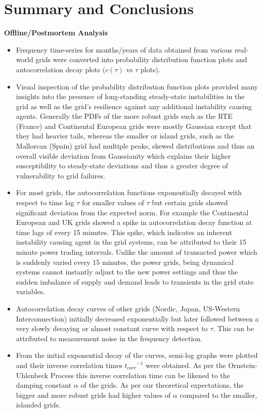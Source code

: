 \section[Conclusions]{Summary and Conclusions}
\label{sec:concl}

\noindent\textbf{Offline/Postmortem Analysis}
\begin{itemize}
	\item Frequency time-series for months/years of data obtained from various real-world grids were converted into probability distribution function plots and autocorrelation decay plots ($c(\tau)$ vs $\tau$ plots).
	\item Visual inspection of the probability distribution function plots provided many insights into the presence of long-standing steady-state instabilities in the grid as well as the grid's resilience against any additional instability causing agents. Generally the PDFs of the more robust grids such as the RTE (France) and Continental European grids were mostly Gaussian except that they had heavier tails, whereas the smaller or island grids, such as the Mallorcan (Spain) grid had multiple peaks, skewed distributions and thus an overall visible deviation from Gaussianity which explains their higher susceptibility to steady-state deviations and thus a greater degree of vulnerability to grid failures. 
	\item For most grids, the autocorrelation functions exponentially decayed with respect to time lag $\tau$ for smaller values of $\tau$ but certain grids showed significant deviation from the expected norm. For example the Continental European and UK grids showed a spike in autocorrelation decay function at time lags of every 15 minutes. This spike, which indicates an inherent instability causing agent in the grid systems, can be attributed to their 15 minute power trading intervals. Unlike the amount of transacted power which is suddenly varied every 15 minutes, the power grids, being dynamical systems cannot instantly adjust to the new power settings and thus the sudden imbalance of supply and demand leads to transients in the grid state variables.
	\item Autocorrelation decay curves of other grids (Nordic, Japan, US-Western Interconnection) initially decreased exponentially but later followed between a very slowly decaying or almost constant curve with respect to $\tau$. This can be attributed to measurement noise in the frequency detection.
	\item From the initial exponential decay of the curves, semi-log graphs were plotted and their inverse correlation times ${t_{corr}}^{-1}$ were obtained. As per the Ornstein-Uhlenbeck Process this inverse correlation time can be likened to the damping constant $\alpha$ of the grids. As per our theoretical expectations, the bigger and more robust grids had higher values of $\alpha$ compared to the smaller, islanded grids.
\end{itemize}

